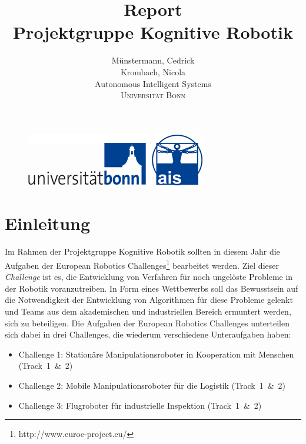 \documentclass[12pt,titlepage, a4paper]{article}
\begin{document}
\begin{figure}
 \centering
 \includegraphics[width=298px,keepaspectratio=true]{./Screens/logo_uni_bonn_ais.png}
\end{figure}


\title{Report\vspace{5mm}\\\textbf{Projektgruppe Kognitive Robotik}\vspace{1cm}}


\author{Münstermann,  Cedrick\\  Krombach, Nicola\\[1cm]
	Autonomous Intelligent Systems\\ \textsc{Universität Bonn}\\}



\maketitle



\section{Einleitung}

Im Rahmen der Projektgruppe Kognitive Robotik sollten in diesem Jahr die Aufgaben der European Robotics Challenges\footnote{http://www.euroc-project.eu/} bearbeitet werden.
Ziel dieser \textit{Challenge} ist es, die Entwicklung von Verfahren für noch ungelöste Probleme in der Robotik voranzutreiben.
In Form eines Wettbewerbs soll das Bewusstsein auf die Notwendigkeit der Entwicklung von Algorithmen für diese Probleme gelenkt und Teams aus dem akademischen und industriellen Bereich ermuntert werden, sich zu beteiligen.
Die Aufgaben der European Robotics Challenges unterteilen sich dabei in drei Challenges, die wiederum verschiedene Unteraufgaben haben:

\begin{itemize}
 \item Challenge 1: Stationäre Manipulationsroboter in Kooperation mit Menschen \mbox{(Track 1 \& 2)}
 \item Challenge 2: Mobile Manipulationsroboter für die Logistik \mbox{(Track 1 \& 2)}
 \item Challenge 3: Flugroboter für industrielle Inspektion \mbox{(Track 1 \& 2)}
\end{itemize}
\end{document}
